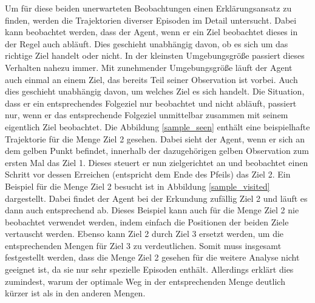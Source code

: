 Um für diese beiden unerwarteten Beobachtungen einen Erklärungsansatz zu finden, werden die Trajektorien diverser Episoden im Detail untersucht. Dabei kann beobachtet werden, dass der Agent, wenn er ein Ziel beobachtet dieses in der Regel auch abläuft. Dies geschieht unabhängig davon, ob es sich um das richtige Ziel handelt oder nicht. In der kleinsten Umgebungsgröße passiert dieses Verhalten nahezu immer. Mit zunehmender Umgebungsgröße läuft der Agent auch einmal an einem Ziel, das bereits Teil seiner Observation ist vorbei. Auch dies geschieht unabhängig davon, um welches Ziel es sich handelt. Die Situation, dass er ein entsprechendes Folgeziel nur beobachtet und nicht abläuft, passiert nur, wenn er das entsprechende Folgeziel unmittelbar zusammen mit seinem eigentlich Ziel beobachtet. Die Abbildung \ref{sample_seen} enthält eine beispielhafte Trajektorie für die Menge \glqq Ziel 2 gesehen\grqq{}. Dabei sieht der Agent, wenn er sich an dem gelben Punkt befindet, innerhalb der dazugehörigen gelben Observation zum ersten Mal das Ziel 1. Dieses steuert er nun zielgerichtet an und beobachtet einen Schritt vor dessen Erreichen (entspricht dem Ende des Pfeils) das Ziel 2. Ein Beispiel für die Menge \glqq Ziel 2 besucht\grqq{} ist in Abbildung \ref{sample_visited} dargestellt. Dabei findet der Agent bei der Erkundung zufällig Ziel 2 und läuft es dann auch entsprechend ab. Dieses Beispiel kann auch für die Menge \glqq Ziel 2 nie beobachtet\grqq{} verwendet werden, indem einfach die Positionen der beiden Ziele vertauscht werden. Ebenso kann Ziel 2 durch Ziel 3 ersetzt werden, um die entsprechenden Mengen für Ziel 3 zu verdeutlichen. Somit muss insgesamt festgestellt werden, dass die Menge \glqq Ziel 2 gesehen\grqq{} für die weitere Analyse nicht geeignet ist, da sie nur sehr spezielle Episoden enthält. Allerdings erklärt dies zumindest, warum der optimale Weg in der entsprechenden Menge deutlich kürzer ist als in den anderen Mengen.

